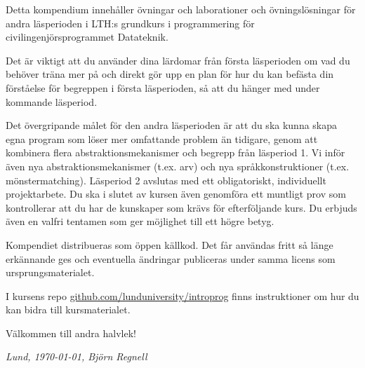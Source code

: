 


Detta kompendium innehåller övningar och laborationer och övningslösningar för andra läsperioden i LTH:s grundkurs i programmering för civilingenjörsprogrammet Datateknik.

Det är viktigt att du använder dina lärdomar från första läsperioden om vad du behöver träna mer på och direkt gör upp en plan för hur du kan befästa din förståelse för begreppen i första läsperioden, så att du hänger med under kommande läsperiod.

Det övergripande målet för den andra läsperioden är att du ska kunna skapa egna program som löser mer omfattande problem än tidigare, genom att kombinera flera abstraktionsmekanismer och begrepp från läsperiod 1. Vi inför även nya abstraktionsmekanismer (t.ex. arv) och nya språkkonstruktioner (t.ex. mönstermatching). Läsperiod 2 avslutas med ett obligatoriskt, individuellt projektarbete. Du ska i slutet av kursen även genomföra ett muntligt prov som kontrollerar att du har de kunskaper som krävs för efterföljande kurs. Du erbjuds även en valfri tentamen som ger möjlighet till ett högre betyg.

Kompendiet distribueras som öppen källkod. Det får användas fritt så länge erkännande ges och eventuella ändringar publiceras under samma licens som ursprungsmaterialet. 

I kursens repo \href{http://github.com/lunduniversity/introprog}{github.com/lunduniversity/introprog} finns instruktioner om hur du kan bidra till kursmaterialet.

Välkommen till andra halvlek!

\vspace{1em}\noindent \textit{\hfill Lund, \today, Björn Regnell}

